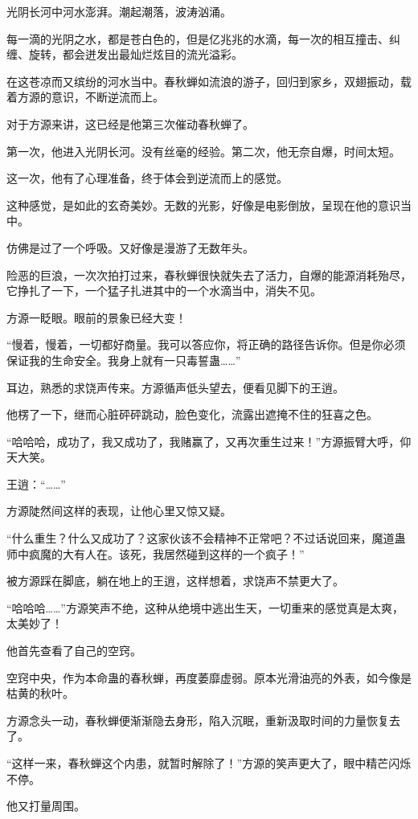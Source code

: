 \begin{this_body}
光阴长河中河水澎湃。潮起潮落，波涛汹涌。

每一滴的光阴之水，都是苍白色的，但是亿兆兆的水滴，每一次的相互撞击、纠缠、旋转，都会迸发出最灿烂炫目的流光溢彩。

在这苍凉而又缤纷的河水当中。春秋蝉如流浪的游子，回归到家乡，双翅振动，载着方源的意识，不断逆流而上。

对于方源来讲，这已经是他第三次催动春秋蝉了。

第一次，他进入光阴长河。没有丝毫的经验。第二次，他无奈自爆，时间太短。

这一次，他有了心理准备，终于体会到逆流而上的感觉。

这种感觉，是如此的玄奇美妙。无数的光影，好像是电影倒放，呈现在他的意识当中。

仿佛是过了一个呼吸。又好像是漫游了无数年头。

险恶的巨浪，一次次拍打过来，春秋蝉很快就失去了活力，自爆的能源消耗殆尽，它挣扎了一下，一个猛子扎进其中的一个水滴当中，消失不见。

方源一眨眼。眼前的景象已经大变！

“慢着，慢着，一切都好商量。我可以答应你，将正确的路径告诉你。但是你必须保证我的生命安全。我身上就有一只毒誓蛊……”

耳边，熟悉的求饶声传来。方源循声低头望去，便看见脚下的王逍。

他楞了一下，继而心脏砰砰跳动，脸色变化，流露出遮掩不住的狂喜之色。

“哈哈哈，成功了，我又成功了，我赌赢了，又再次重生过来！”方源振臂大呼，仰天大笑。

王逍：“……”

方源陡然间这样的表现，让他心里又惊又疑。

“什么重生？什么又成功了？这家伙该不会精神不正常吧？不过话说回来，魔道蛊师中疯魔的大有人在。该死，我居然碰到这样的一个疯子！”

被方源踩在脚底，躺在地上的王逍，这样想着，求饶声不禁更大了。

“哈哈哈……”方源笑声不绝，这种从绝境中逃出生天，一切重来的感觉真是太爽，太美妙了！

他首先查看了自己的空窍。

空窍中央，作为本命蛊的春秋蝉，再度萎靡虚弱。原本光滑油亮的外表，如今像是枯黄的秋叶。

方源念头一动，春秋蝉便渐渐隐去身形，陷入沉眠，重新汲取时间的力量恢复去了。

“这样一来，春秋蝉这个内患，就暂时解除了！”方源的笑声更大了，眼中精芒闪烁不停。

他又打量周围。


\end{this_body}

